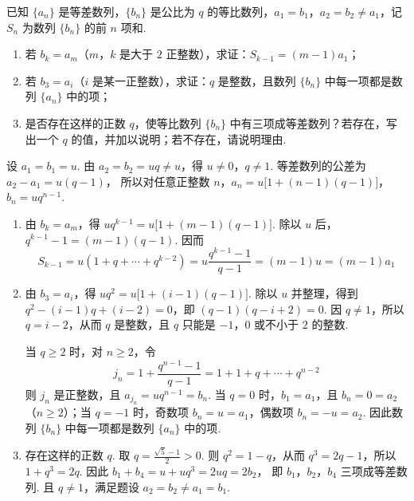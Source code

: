 \begin{problem}
已知 \(\{a_{n}\}\) 是等差数列，\(\{b_{n}\}\) 是公比为 \(q\) 的等比数列，\(a_{1} = b_{1}\)，\(a_{2} = b_{2} \neq a_{1}\)，记 \(S_{n}\) 为数列 \(\{b_{n}\}\) 的前 \(n\) 项和.

\begin{enumerate}
\item 若 \(b_{k} = a_{m}\)（\(m\)，\(k\) 是大于 \(2\) 正整数），求证：\(S_{k-1} = (m - 1)a_{1}\)；
\item 若 \(b_{3} = a_{i}\)（\(i\) 是某一正整数），求证：\(q\) 是整数，且数列 \(\{b_{n}\}\) 中每一项都是数列 \(\{a_{n}\}\) 中的项；
\item 是否存在这样的正数 \(q\)，使等比数列 \(\{b_{n}\}\) 中有三项成等差数列？若存在，写出一个 \(q\) 的值，并加以说明；若不存在，请说明理由.
\end{enumerate}
\end{problem}

\begin{solution}
设 \(a_{1}=b_{1}=u\). 由 \(a_{2}=b_{2}=uq\neq u\)，得 \(u\neq0\)，\(q\neq1\). 等差数列的公差为
\(a_{2}-a_{1}=u(q-1)\)，
所以对任意正整数 \(n\)，\(a_{n}=u\bigl[1+(n-1)(q-1)\bigr]\)，\(b_{n}=uq^{n-1}\).

\begin{enumerate}
\item 由 \(b_{k}=a_{m}\)，得
\(uq^{k-1}=u\bigl[1+(m-1)(q-1)\bigr]\).
除以 \(u\) 后，\(q^{k-1}-1=(m-1)(q-1)\). 因而
\[
S_{k-1}=u\left(1+q+\cdots+q^{k-2}\right)=u\frac{q^{k-1}-1}{q-1}=(m-1)u=(m-1)a_{1}
\]
\item 由 \(b_{3}=a_{i}\)，得
\(uq^{2}=u\bigl[1+(i-1)(q-1)\bigr]\).
除以 \(u\) 并整理，得到 \(q^{2}-(i-1)q+(i-2)=0\)，即 \((q-1)(q-i+2)=0\).
因 \(q\neq1\)，所以 \(q=i-2\)，从而 \(q\) 是整数，且 \(q\) 只能是 \(-1\)，\(0\) 或不小于 \(2\) 的整数.

当 \(q\geqslant2\) 时，对 \(n\geqslant2\)，令
\[
j_{n}=1+\frac{q^{n-1}-1}{q-1}=1+1+q+\cdots+q^{n-2}
\]
则 \(j_{n}\) 是正整数，且
\(a_{j_{n}}=u q^{n-1}=b_{n}\).
当 \(q=0\) 时，\(b_{1}=a_{1}\)，且 \(b_{n}=0=a_{2}\)（\(n\geqslant2\)）；当 \(q=-1\) 时，奇数项 \(b_{n}=u=a_{1}\)，偶数项 \(b_{n}=-u=a_{2}\). 因此数列 \(\{b_{n}\}\) 中每一项都是数列 \(\{a_{n}\}\) 中的项.
\item 存在这样的正数 \(q\). 取
\(q=\frac{\sqrt{5}-1}{2}>0\).
则 \(q^{2}=1-q\)，从而 \(q^{3}=2q-1\)，所以 \(1+q^{3}=2q\). 因此
\(b_{1}+b_{4}=u+uq^{3}=2uq=2b_{2}\)，
即 \(b_{1}\)，\(b_{2}\)，\(b_{4}\) 三项成等差数列. 且 \(q\neq1\)，满足题设 \(a_{2}=b_{2}\neq a_{1}=b_{1}\).
\end{enumerate}
\end{solution}

